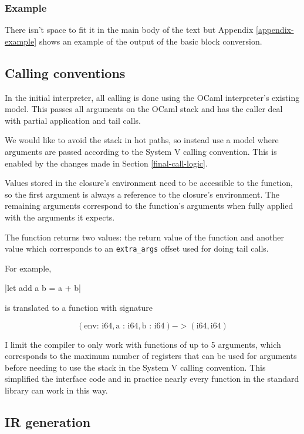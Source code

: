 \subsubsection{Example}

There isn't space to fit it in the main body of the text but Appendix \ref{appendix-example} shows
an example of the
output of the basic block conversion.

\subsection{Calling conventions}

In the initial interpreter, all calling is done using the OCaml interpreter's existing model. This
passes all arguments on the OCaml stack and has the caller deal with partial application and tail
calls.

We would like to avoid the stack in hot paths, so instead use a model where arguments are passed
according to the
System V calling convention. This is enabled by the changes made in Section \ref{final-call-logic}.

Values stored in the closure's environment need to be accessible to the function, so the first
argument is always a reference to the closure's environment. The remaining arguments correspond to
the function's arguments when fully applied with the arguments it expects.

The function returns two values: the return value of the function and another value which
corresponds to an \texttt{extra\_args} offset used for doing tail calls.

For example,

|let add a b = a + b|

\noindent
is translated to a function with signature

\[(\text{env: i64}, \text{a : i64}, \text{b : i64}) -> (\text{i64}, \text{i64})\]

\noindent
I limit the compiler to only work with functions of up to 5 arguments, which corresponds to the
maximum number of registers that can be used for arguments before needing to use the stack in the
System V calling convention. This simplified the interface code and in practice nearly every
function
in the standard library can work in this way.

\subsection{IR generation} \label{opt-irgen}

